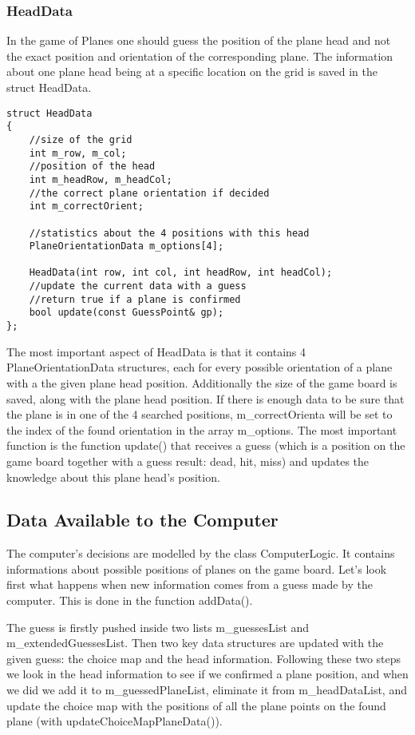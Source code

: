 \subsubsection{HeadData}

In the game of Planes one should guess the position of the plane head and not the exact position and orientation of the corresponding plane. The information about one plane head being at a specific location on the grid is saved in the struct HeadData.

\begin{lstlisting}
struct HeadData
{
	//size of the grid
	int m_row, m_col;
	//position of the head
	int m_headRow, m_headCol;
	//the correct plane orientation if decided
	int m_correctOrient;
	
	//statistics about the 4 positions with this head
	PlaneOrientationData m_options[4];
	
	HeadData(int row, int col, int headRow, int headCol);
	//update the current data with a guess
	//return true if a plane is confirmed
	bool update(const GuessPoint& gp);
};
\end{lstlisting}

The most important aspect of HeadData is that it contains 4 PlaneOrientationData structures, each for every possible orientation of a plane with a the given plane head position. Additionally the size of the game board is saved, along with the plane head position. If there is enough data to be sure that the plane is in one of the 4 searched positions, m\_correctOrienta will be set to the index of the found orientation in the array m\_options. The most important function is the function update() that receives a guess (which is a position on the game board together with a guess result: dead, hit, miss) and updates the knowledge about this plane head's position.

\subsection{Data Available to the Computer}

The computer's decisions are modelled by the class ComputerLogic. It contains informations about possible positions of planes on the game board. Let's look first what happens when new information comes from a guess made by the computer. This is done in the function addData().

The guess is firstly pushed inside two lists m\_guessesList and m\_extendedGuessesList. Then two key data structures are updated with the given guess: the choice map and the head information. Following these two steps we look in the head information to see if we confirmed a plane position, and when we did we add it to m\_guessedPlaneList, eliminate it from m\_headDataList, and update the choice map with the positions of all the plane points on the found plane (with updateChoiceMapPlaneData()).

